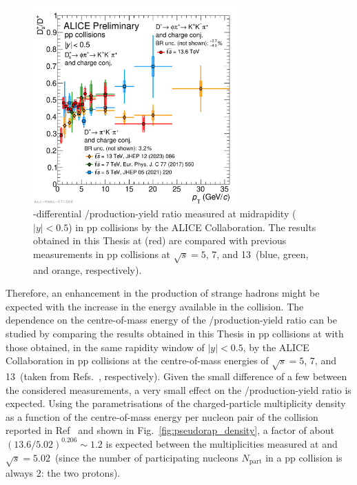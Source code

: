 \begin{figure}[htb]
    \centering
    \includegraphics[width=0.7\textwidth]{Figures/Chapter 7/dsoverdpluscomparisonalice_0.pdf}
    \caption{\pt-differential \ds/\dpl production-yield ratio measured at midrapidity ($\lvert y\rvert<0.5$) in pp collisions by the ALICE Collaboration. The results obtained in this Thesis at \thirteen (red) are compared with previous measurements in pp collisions at $\sqrt{s} = 5$, 7, and 13~\tev (blue, green, and orange, respectively).}
    \label{fig:dsdplvsenergy}
\end{figure}

Therefore, an enhancement in the production of strange hadrons might be expected with the increase in the energy available in the collision. The dependence on the centre-of-mass energy of the \ds/\dpl production-yield ratio can be studied by comparing the results obtained in this Thesis in pp collisions at \thirteen with those obtained, in the same rapidity window of \mbox{$\lvert y\rvert<0.5$}, by the ALICE Collaboration in pp collisions at the centre-of-mass energies of $\sqrt{s} = 5$, 7, and 13~\tev (taken from Refs.~\cite{ALICE:2021mgk,ALICE:2017olh,ALICE:2023sgl}, respectively). Given the small difference of a few \tev between the considered measurements, a very small effect on the \ds/\dpl production-yield ratio is expected. Using the parametrisations of the charged-particle multiplicity density as a function of the centre-of-mass energy per nucleon pair of the collision reported in Ref~\cite{ALICE:2015juo} and shown in Fig.~\ref{fig:pseudorap_density}, a factor of about $(13.6/5.02)^{0.206} \sim 1.2$ is expected between the multiplicities measured at \thirteen and $\sqrt{s} = 5.02$~\tev (since the number of participating nucleons $N_\mathrm{part}$ in a pp collision is always 2: the two protons). 

